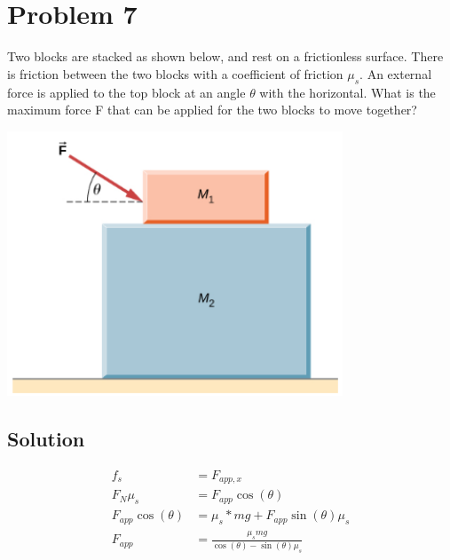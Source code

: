 \documentclass[12pt]{article}
\begin{document}
\pagebreak
\section*{Problem 7}
Two blocks are stacked as shown below, and rest on a frictionless surface. There is friction between the two blocks with a coefficient of friction $\mu_s$. An external force is applied to the top block at an angle $\theta$ with the horizontal. What is the maximum force F that can be applied for the two blocks to move together?

\begin{center}
    \includegraphics*[width=10cm]{graph_7.png}
\end{center}

\subsection*{Solution}
\begin{align*}
    f_s &= F_{app,x}\\
    F_N \mu_s &= F_{app}\cos(\theta)\\
    F_{app}\cos(\theta) &= \mu_s * mg + F_{app}\sin(\theta)\mu_s\\
    F_{app} &= \boxed{\frac{\mu_s mg}{\cos(\theta) - \sin(\theta)\mu_s}}
\end{align*}
\end{document}
